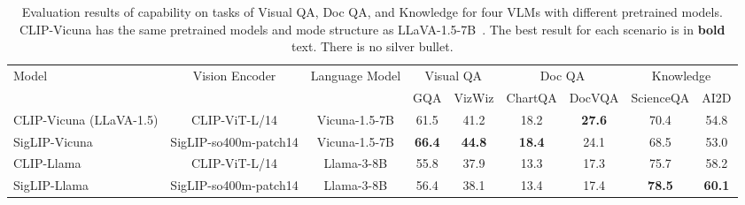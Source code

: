 \begingroup
\renewcommand{\arraystretch}{1.2}
\begin{table*}[!ht]
\centering
\caption{Evaluation results of capability on tasks of Visual QA, Doc QA, and Knowledge for four VLMs with different pretrained models. CLIP-Vicuna has the same pretrained models and mode structure as LLaVA-1.5-7B~\cite{liu2023improved}. 
The best result for each scenario is in \textbf{bold} text.
There is no silver bullet.}
\label{table:vlm_motivation}
\scriptsize
\begin{tabular}{lcc|cc|cc|cc}
    \toprule
    \multirow{2}{*}{Model} & \multirow{2}{*}{Vision Encoder} & \multirow{2}{*}{Language Model} & 
    \multicolumn{2}{c|}{Visual QA} & \multicolumn{2}{c|}{Doc QA} & \multicolumn{2}{c}{Knowledge}
    \\
    & & & GQA & VizWiz & ChartQA & DocVQA & ScienceQA  & AI2D \\
    \hline
    CLIP-Vicuna (LLaVA-1.5) & CLIP-ViT-L/14 & Vicuna-1.5-7B & 61.5 & 41.2 & 18.2 & \textbf{27.6}  & 70.4 & 54.8 \\
    
    \hline
    SigLIP-Vicuna & SigLIP-so400m-patch14 & Vicuna-1.5-7B & \textbf{66.4} & \textbf{44.8} & \textbf{18.4} & 24.1 & 68.5 & 53.0 \\
    CLIP-Llama & CLIP-ViT-L/14 & Llama-3-8B & 55.8 & 37.9 & 13.3 & 17.3 & 75.7 & 58.2\\
    SigLIP-Llama &  SigLIP-so400m-patch14 & Llama-3-8B & 56.4 & 38.1 & 13.4 & 17.4 & \textbf{78.5} & \textbf{60.1}  \\
    

\end{tabular}
\end{table*}
